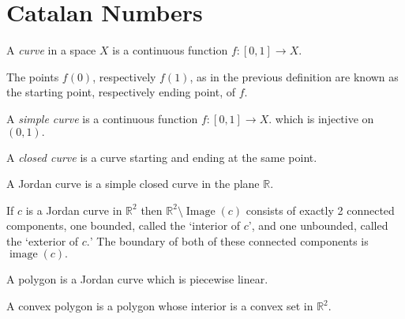 \section{Catalan Numbers}
\begin{definition}[Curve]
	A \emph{curve} in a space $X$ is a continuous function $f \colon [0,1]
	\to X.$ 
\end{definition}
The points $f(0)$, respectively $f(1)$, as in the previous definition are known
as the starting point, respectively ending point, of $f.$
\begin{definition}
	A \emph{simple curve} is a continuous function $f \colon [0,1] \to X.$
	which is injective on $(0,1).$
\end{definition}
\begin{definition}
	A \emph{closed curve} is a curve starting and ending at the same
	point.
\end{definition}
\begin{definition}
	A Jordan curve is a simple closed curve in the plane $\mathbb{R}.$	
\end{definition}
\begin{theorem}
	If $c$ is a Jordan curve in $\mathbb{R}^2$ then $\mathbb{R}^2
	\setminus \operatorname{Image}(c)$ consists of exactly 2 
	connected components, one bounded, called the `interior of $c$',	and one unbounded,
	called the `exterior of $c.$' The boundary of both of these connected components is $\operatorname{image}(c).$
\end{theorem}

\begin{definition}[Polygon]
	A polygon is a Jordan curve which is piecewise linear.
\end{definition}
\begin{definition}
	A convex polygon is a polygon whose interior is a convex set in
	$\mathbb{R}^2.$
\end{definition}

\begin{center}
\end{center}


